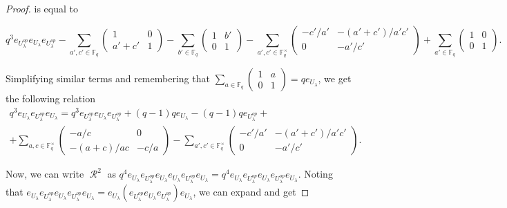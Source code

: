 \documentclass[10pt,a4paper]{amsart}
\DeclareMathOperator{\R}{\mathcal{R}}
\begin{document}
\begin{proof}
is equal to

\[q^3 e_{U_{\lambda}^{op}}e_{U_{\lambda}}e_{U_{\lambda}^{op}} - \sum_{a', c' \in \mathbb{F}_q} 
\begin{pmatrix}
1 & 0 \\
a'+c' & 1 
\end{pmatrix} - \sum_{b' \in \mathbb{F}_q}
\begin{pmatrix}
1 & b' \\
0 & 1 
\end{pmatrix}
- \sum_{a', c' \in \mathbb{F}_q^{\times}}
\begin{pmatrix}
-c'/a' & -(a'+c')/a'c' \\
0 & -a'/c' 
\end{pmatrix}
+\sum_{a' \in \mathbb{F}_q}
\begin{pmatrix}
1 & 0 \\
0 & 1 
\end{pmatrix}.\]

Simplifying similar terms and remembering that $\sum_{a \in \mathbb{F}_q} \begin{pmatrix}
1 & a \\
0 & 1 
\end{pmatrix} = qe_{U_{\lambda}}$, we get the following relation
\begin{multline*}
    q^3 e_{U_{\lambda}}e_{U_{\lambda}^{op}}e_{U_{\lambda}} = q^3 e_{U_{\lambda}^{op}}e_{U_{\lambda}}e_{U_{\lambda}^{op}} + (q-1) qe_{U_{\lambda}} - (q-1) qe_{U_{\lambda}^{op}} +\\
    +
    \sum_{a, c \in \mathbb{F}_q^{\times}}\begin{pmatrix}
    -a/c & 0 \\
    -(a+c)/ac & -c/a 
    \end{pmatrix}
    - \sum_{a', c' \in \mathbb{F}_q^{\times}}
    \begin{pmatrix}
    -c'/a' & -(a'+c')/a'c' \\
    0 & -a'/c' 
    \end{pmatrix}.
\end{multline*}

Now, we can write $\R^2$ as $ q^4 e_{U_{\lambda}}e_{U_{\lambda}^{op}}e_{U_{\lambda}}e_{U_{\lambda}}e_{U_{\lambda}^{op}}e_{U_{\lambda}}=q^4 e_{U_{\lambda}}e_{U_{\lambda}^{op}}e_{U_{\lambda}}e_{U_{\lambda}^{op}}e_{U_{\lambda}}$. Noting that $e_{U_{\lambda}}e_{U_{\lambda}^{op}}e_{U_{\lambda}}e_{U_{\lambda}^{op}}e_{U_{\lambda}} = e_{U_{\lambda}}(e_{U_{\lambda}^{op}}e_{U_{\lambda}}e_{U_{\lambda}^{op}})e_{U_{\lambda}}$, we can expand and get


\end{proof}
\end{document}
